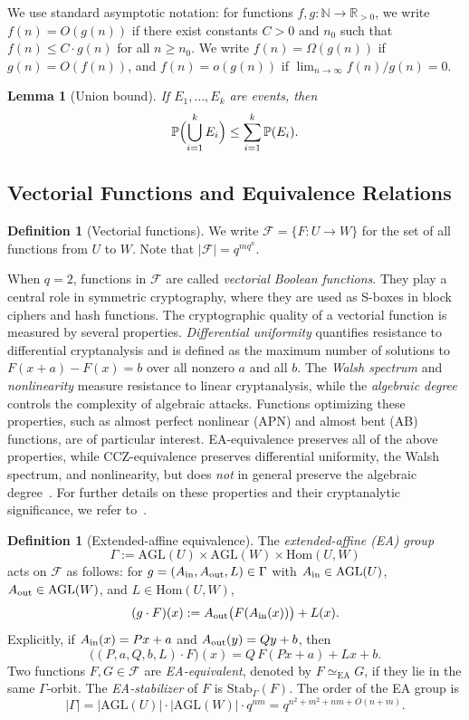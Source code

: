 \documentclass[11pt]{article}
\newtheorem{lemma}[theorem]{Lemma}
\theoremstyle{definition}
\newtheorem{definition}[theorem]{Definition}
\newcommand{\Fcal}{\mathcal{F}}
\newcommand{\Gam}{\Gamma}
\newcommand{\AGL}{\mathrm{AGL}}
\newcommand{\Hom}{\mathrm{Hom}}
\newcommand{\Stab}{\mathrm{Stab}}
\renewcommand{\Pr}{\mathbb{P}}
\begin{document}
We use standard asymptotic notation: for functions $f,g:\mathbb{N}\to\mathbb{R}_{>0}$,
we write $f(n)=O(g(n))$ if there exist constants $C>0$ and $n_0$ such that
$f(n)\le C\cdot g(n)$ for all $n\ge n_0$. We write $f(n)=\Omega(g(n))$ if
$g(n)=O(f(n))$, and $f(n)=o(g(n))$ if $\lim_{n\to\infty}f(n)/g(n)=0$.

\begin{lemma}[Union bound]
If $E_1,\dots,E_k$ are events, then
\[
   \Pr\Bigl(\bigcup_{i=1}^k E_i\Bigr) \le \sum_{i=1}^k \Pr(E_i).
\]
\end{lemma}

\subsection{Vectorial Functions and Equivalence Relations}

\begin{definition}[Vectorial functions]
We write $\Fcal=\{F:U\to W\}$ for the set of all functions from $U$ to $W$.
Note that $|\Fcal|=q^{mq^n}$.
\end{definition}

When $q=2$, functions in $\Fcal$ are called \emph{vectorial Boolean functions}.
They play a central role in symmetric cryptography, where they are used as
S-boxes in block ciphers and hash functions.
The cryptographic quality of a vectorial function is measured by several properties.
\emph{Differential uniformity} quantifies resistance to differential cryptanalysis and is
defined as the maximum number of solutions to $F(x+a) - F(x) = b$ over all nonzero $a$ and all
$b$. The \emph{Walsh spectrum} and \emph{nonlinearity} measure resistance to linear cryptanalysis,
while the \emph{algebraic degree} controls the complexity of algebraic attacks. Functions
optimizing these properties, such as almost perfect nonlinear (APN) and almost bent (AB)
functions, are of particular interest. EA-equivalence preserves all of the above
properties, while CCZ-equivalence preserves differential uniformity, the Walsh spectrum,
and nonlinearity, but does \emph{not} in general preserve the algebraic
degree~\cite{budaghyan2020}. For further details on these properties and their
cryptanalytic significance, we refer to~\cite{carlet2010}.

\begin{definition}[Extended-affine equivalence]\label{def:EA}
The \emph{extended-affine (EA) group}
\[
   \Gam := \AGL(U)\times \AGL(W)\times \Hom(U,W)
\]
acts on $\Fcal$ as follows: for $g=(A_{\rm in},A_{\rm out},L)\in \Gam$ with
$A_{\rm in}\in\AGL(U)$, $A_{\rm out}\in\AGL(W)$, and $L\in\Hom(U,W)$,
\[
   (g\cdot F)(x)
   := A_{\rm out}\bigl(F(A_{\rm in}(x))\bigr)+L(x).
\]
Explicitly, if $A_{\rm in}(x)=Px+a$ and $A_{\rm out}(y)=Qy+b$, then
\[
   \bigl((P,a,Q,b,L)\cdot F\bigr)(x) = Q\,F(Px+a)+Lx+b.
\]
Two functions $F,G\in\Fcal$ are \emph{EA-equivalent}, denoted by $F \simeq_{\mathrm{EA}} G$, if they lie in the same
$\Gam$-orbit. The \emph{EA-stabilizer} of $F$ is $\Stab_\Gam(F)$.
The order of the EA group is
\[
   |\Gam|
   = |\AGL(U)|\cdot|\AGL(W)|\cdot q^{nm}
   = q^{n^2+m^2+nm+O(n+m)}.
\]
\end{definition}
\end{document}
